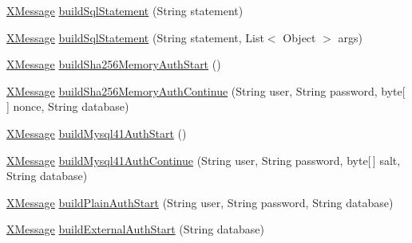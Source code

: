 \begin{DoxyCompactItemize}
\item 
\mbox{\hyperlink{classcom_1_1mysql_1_1cj_1_1protocol_1_1x_1_1_x_message}{X\+Message}} \mbox{\hyperlink{classcom_1_1mysql_1_1cj_1_1protocol_1_1x_1_1_x_message_builder_a60e482092bcdce0fd60ecd466daed306}{build\+Sql\+Statement}} (String statement)
\item 
\mbox{\hyperlink{classcom_1_1mysql_1_1cj_1_1protocol_1_1x_1_1_x_message}{X\+Message}} \mbox{\hyperlink{classcom_1_1mysql_1_1cj_1_1protocol_1_1x_1_1_x_message_builder_a2c3993eeb6a20211b7a81f15784fb537}{build\+Sql\+Statement}} (String statement, List$<$ Object $>$ args)
\item 
\mbox{\hyperlink{classcom_1_1mysql_1_1cj_1_1protocol_1_1x_1_1_x_message}{X\+Message}} \mbox{\hyperlink{classcom_1_1mysql_1_1cj_1_1protocol_1_1x_1_1_x_message_builder_abff8c32a0e149ac708648441a53e160f}{build\+Sha256\+Memory\+Auth\+Start}} ()
\item 
\mbox{\hyperlink{classcom_1_1mysql_1_1cj_1_1protocol_1_1x_1_1_x_message}{X\+Message}} \mbox{\hyperlink{classcom_1_1mysql_1_1cj_1_1protocol_1_1x_1_1_x_message_builder_a590a0e110a2f72f252fcf4ef7c528a4f}{build\+Sha256\+Memory\+Auth\+Continue}} (String user, String password, byte\mbox{[}$\,$\mbox{]} nonce, String database)
\item 
\mbox{\hyperlink{classcom_1_1mysql_1_1cj_1_1protocol_1_1x_1_1_x_message}{X\+Message}} \mbox{\hyperlink{classcom_1_1mysql_1_1cj_1_1protocol_1_1x_1_1_x_message_builder_a57de6765909deabbc8dc2ed1fd6a4c57}{build\+Mysql41\+Auth\+Start}} ()
\item 
\mbox{\hyperlink{classcom_1_1mysql_1_1cj_1_1protocol_1_1x_1_1_x_message}{X\+Message}} \mbox{\hyperlink{classcom_1_1mysql_1_1cj_1_1protocol_1_1x_1_1_x_message_builder_ac2db2e94fe80fb5b661a8cf05303487c}{build\+Mysql41\+Auth\+Continue}} (String user, String password, byte\mbox{[}$\,$\mbox{]} salt, String database)
\item 
\mbox{\hyperlink{classcom_1_1mysql_1_1cj_1_1protocol_1_1x_1_1_x_message}{X\+Message}} \mbox{\hyperlink{classcom_1_1mysql_1_1cj_1_1protocol_1_1x_1_1_x_message_builder_af517dd056ab2ea661d42df011f60fd1e}{build\+Plain\+Auth\+Start}} (String user, String password, String database)
\item 
\mbox{\hyperlink{classcom_1_1mysql_1_1cj_1_1protocol_1_1x_1_1_x_message}{X\+Message}} \mbox{\hyperlink{classcom_1_1mysql_1_1cj_1_1protocol_1_1x_1_1_x_message_builder_a905274bec5dac7689e4c96b5b6ef5a5c}{build\+External\+Auth\+Start}} (String database)
\end{DoxyCompactItemize}


